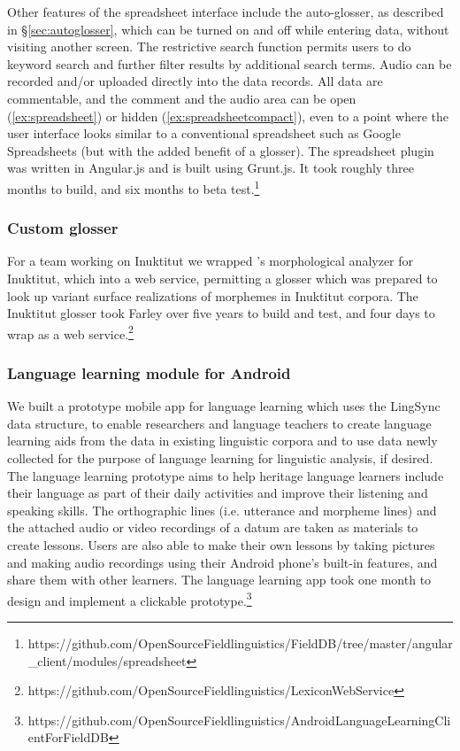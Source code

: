 \documentclass[letterpaper, 12pt, dvips]{mitwpl}
\begin{document}
Other features of the spreadsheet interface include the auto-glosser, as described in \S\ref{sec:autoglosser}, which can be turned on and off while entering data, without visiting another screen.  The restrictive search function permits users to do keyword search and further filter results by additional search terms. Audio can be recorded and/or  uploaded directly into the data records. All data are commentable, and the comment and the audio area can be  open  (\ref{ex:spreadsheet}) or hidden  (\ref{ex:spreadsheetcompact}), even to a point where the user interface looks similar to a conventional spreadsheet such as Google Spreadsheets (but with the added benefit of a glosser). The spreadsheet plugin was written in Angular.js and is built using Grunt.js. It took roughly three months to build, and six months to beta test.\footnote{https://github.com/OpenSourceFieldlinguistics/FieldDB/tree/master/angular\_client/modules/spreadsheet}


\subsubsection{Custom glosser}

For a team working on Inuktitut \citep{Bielig:2013} we wrapped \cite{Farley:2012:Online}'s morphological analyzer for Inuktitut, which  into a web service, permitting a glosser which was prepared to look up variant  surface realizations of morphemes in Inuktitut corpora. 
The Inuktitut glosser took Farley over five years to build and test, and four days to wrap as a web service.\footnote{https://github.com/OpenSourceFieldlinguistics/LexiconWebService}%

\subsubsection{Language learning module for Android}

We built a prototype mobile app for language learning which uses the LingSync data structure, to enable researchers and language teachers to create language learning aids from the data in existing linguistic corpora and to use data newly collected for the purpose of language learning for linguistic analysis, if desired.
The language learning prototype aims to help heritage language learners include their language as part of their daily activities and improve their listening and speaking skills.
The orthographic lines (i.e.
utterance and morpheme lines) and the attached audio or video recordings of a datum are taken as materials to create lessons. Users are also able to make their own lessons by taking pictures and making audio recordings using their Android phone's built-in features, and share them with other learners. The language learning app took one month to design and implement a clickable prototype.\footnote{https://github.com/OpenSourceFieldlinguistics/AndroidLanguageLearningClientForFieldDB}
\end{document}

